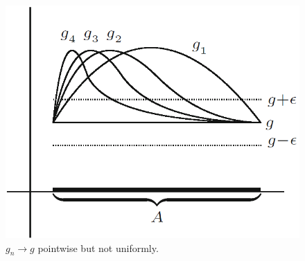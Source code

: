 \documentclass{article}
\begin{document}
           \begin{figure}[ht!]
               \centering
               \includegraphics[width=0.5\linewidth]{figs/pointwise_cont.png}
               \caption{$g_n \to g$ pointwise but not uniformly.}
               \label{pointwise_cont}
           \end{figure}
           
\end{document}
